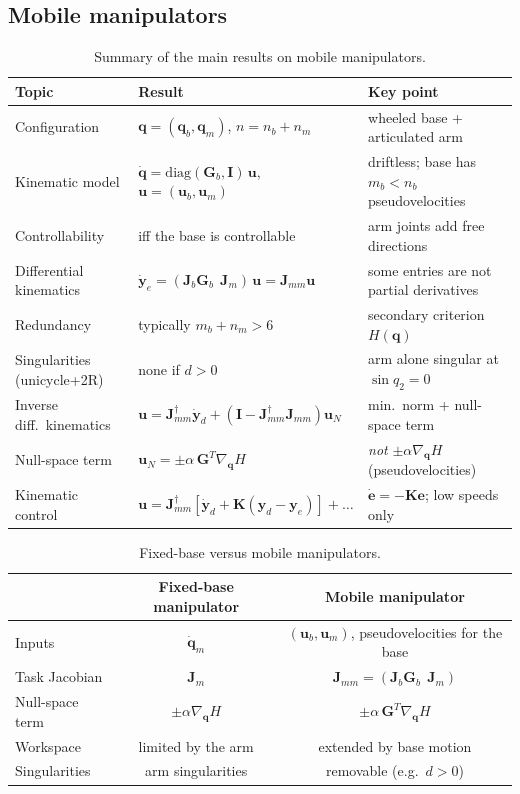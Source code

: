 \documentclass[11pt,a4paper]{article}
\newcommand{\qbase}{\bm{q}_b}
\newcommand{\qarm}{\bm{q}_m}
\newcommand{\ubase}{\bm{u}_b}
\newcommand{\uarm}{\bm{u}_m}
\newcommand{\Gbase}{\bm{G}_b}
\newcommand{\Jbase}{\bm{J}_b}
\newcommand{\Jarm}{\bm{J}_m}
\newcommand{\Jmm}{\bm{J}_{mm}}
\newcommand{\ye}{\bm{y}_e}
\newcommand{\grad}{\nabla_{\!\bm{q}}}
\theoremstyle{plain}
\theoremstyle{definition}
\theoremstyle{remark}
\begin{document}
\subsection*{Mobile manipulators}

\begin{table}[ht]
\centering
\renewcommand{\arraystretch}{1.3}
\begin{tabular}{@{}>{\raggedright\arraybackslash}p{3.2cm}>{\raggedright\arraybackslash}p{6.4cm}>{\raggedright\arraybackslash}p{5.2cm}@{}}
\toprule
\textbf{Topic} & \textbf{Result} & \textbf{Key point}\\
\midrule
Configuration & $\bm q=(\qbase,\qarm)$, $n=n_b+n_m$ & wheeled base + articulated arm\\
Kinematic model & $\dot{\bm q}=\mathrm{diag}(\Gbase,\bm I)\,\bm u$, $\bm u=(\ubase,\uarm)$ & driftless; base has $m_b<n_b$ pseudovelocities\\
Controllability & iff the base is controllable & arm joints add free directions\\
Differential kinematics & $\dot{\bm y}_e=(\Jbase\Gbase\ \ \Jarm)\,\bm u=\Jmm\bm u$ & some entries are not partial derivatives\\
Redundancy & typically $m_b+n_m>6$ & secondary criterion $H(\bm q)$\\
Singularities (unicycle+2R) & none if $d>0$ & arm alone singular at $\sin q_2=0$\\
Inverse diff.\ kinematics & $\bm u=\Jmm^\dagger\dot{\bm y}_d+(\bm I-\Jmm^\dagger\Jmm)\bm u_N$ & min.\ norm + null-space term\\
Null-space term & $\bm u_N=\pm\alpha\,\bm G^T\grad H$ & \emph{not} $\pm\alpha\grad H$ (pseudovelocities)\\
Kinematic control & $\bm u=\Jmm^\dagger[\dot{\bm y}_d+\bm K(\bm y_d-\ye)]+\dots$ & $\dot{\bm e}=-\bm K\bm e$; low speeds only\\
\bottomrule
\end{tabular}
\caption{Summary of the main results on mobile manipulators.}
\end{table}

\begin{table}[ht]
\centering
\renewcommand{\arraystretch}{1.3}
\begin{tabular}{@{}lcc@{}}
\toprule
 & \textbf{Fixed-base manipulator} & \textbf{Mobile manipulator}\\
\midrule
Inputs & $\dot{\bm q}_m$ & $(\ubase,\uarm)$, pseudovelocities for the base\\
Task Jacobian & $\Jarm$ & $\Jmm=(\Jbase\Gbase\ \ \Jarm)$\\
Null-space term & $\pm\alpha\grad H$ & $\pm\alpha\,\bm G^T\grad H$\\
Workspace & limited by the arm & extended by base motion\\
Singularities & arm singularities & removable (e.g.\ $d>0$)\\
\bottomrule
\end{tabular}
\caption{Fixed-base versus mobile manipulators.}
\end{table}
\end{document}
